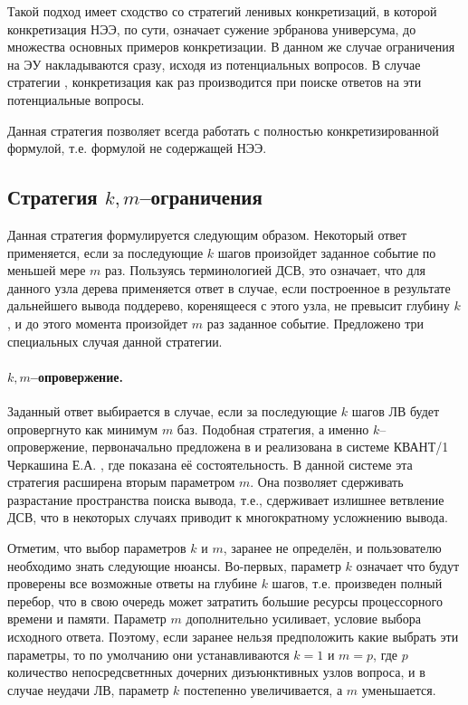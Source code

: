 Такой подход имеет сходство со стратегий ленивых конкретизаций, в которой конкретизация НЭЭ, по сути, означает сужение эрбранова универсума, до множества основных примеров конкретизации. В данном же случае ограничения на ЭУ накладываются сразу, исходя из потенциальных вопросов. В случае стратегии , конкретизация как раз производится при поиске ответов на эти потенциальные вопросы.

Данная стратегия позволяет всегда работать с полностью конкретизированной формулой, т.е. формулой не содержащей НЭЭ.

\subsection{Стратегия $k,m$--ограничения}
Данная стратегия формулируется следующим образом. Некоторый ответ применяется, если за последующие $k$ шагов произойдет заданное событие по меньшей мере $m$ раз. Пользуясь терминологией ДСВ, это означает, что для данного узла дерева применяется ответ в случае, если построенное в результате дальнейшего вывода поддерево, коренящееся с этого узла, не превысит глубину $k$, и до этого момента произойдет $m$ раз заданное событие. Предложено три специальных случая данной стратегии.

\paragraph{$k,m$--опровержение.} Заданный ответ выбирается в случае, если за последующие $k$ шагов ЛВ будет опровергнуто как минимум $m$ баз. Подобная стратегия, а именно $k$--опровержение, первоначально предложена  в \cite{ICDS2000} и реализована в системе КВАНТ/1 Черкашина Е.А. \cite{dissChe}, где показана её состоятельность. В данной системе эта стратегия расширена вторым параметром $m$. Она позволяет сдерживать разрастание пространства поиска вывода, т.е., сдерживает излишнее ветвление ДСВ, что в некоторых случаях приводит к многократному усложнению вывода.

Отметим, что выбор параметров $k$ и $m$, заранее не определён, и пользователю необходимо знать следующие нюансы. Во-первых, параметр $k$ означает что будут проверены все возможные ответы на глубине $k$ шагов, т.е. произведен полный перебор, что в свою очередь может затратить большие ресурсы процессорного времени и памяти. Параметр $m$ дополнительно усиливает, условие выбора исходного ответа. Поэтому, если заранее нельзя предположить какие выбрать эти параметры, то по умолчанию они устанавливаются $k=1$ и $m=p$, где $p$ количество непосредсветнных дочерних дизъюнктивных узлов вопроса, и в случае неудачи ЛВ, параметр $k$ постепенно увеличивается, а $m$ уменьшается.

